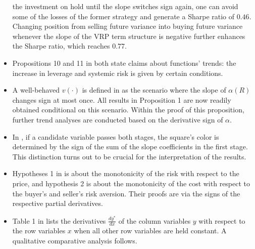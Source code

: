 \documentclass[11pt]{book}
\begin{document}
\begin{itemize}
the investment on hold until the slope switches sign again, one can
avoid some of the losses of the former strategy and generate a Sharpe
ratio of $0.46$. Changing position from selling future variance into
buying future variance whenever the slope of the VRP term structure
is negative further enhances the Sharpe ratio, which reaches $0.77$.
\item Propositions 10 and 11 in \cite{albuquerque2019incentive}
both state claims about functions' trends: the increase in leverage
and systemic risk is given by certain conditions.
\item A well-behaved $v\left(\cdot\right)$ is defined in \cite{de2019strategic}
as the scenario where the slope of $\alpha\left(R\right)$ changes
sign at most once. All results in Proposition 1 are now readily obtained
conditional on this scenario. Within the proof of this proposition,
further trend analyses are conducted based on the derivative sign
of $\alpha$.
\item In \cite{hartwig2020identifying}, if a candidate
variable passes both stages, the square's color is determined by the
sign of the sum of the slope coefficients in the first stage. This
distinction turns out to be crucial for the interpretation of the
results.
\item Hypotheses 1 in \cite{hyndman2021dissolving}
is about the monotonicity of the risk with respect to the price, and
hypothesis 2 is about the monotonicity of the cost with respect to
the buyer's and seller's risk aversion. Their proofs are via the signs
of the respective partial derivatives.
\item Table 1 in \cite{bouvardlabor}
lists the derivatives $\frac{dy^{*}}{dx}$ of the column variables
$y$ with respect to the row variables $x$ when all other row variables
are held constant. A qualitative comparative analysis follows.
\end{itemize}
\end{document}
